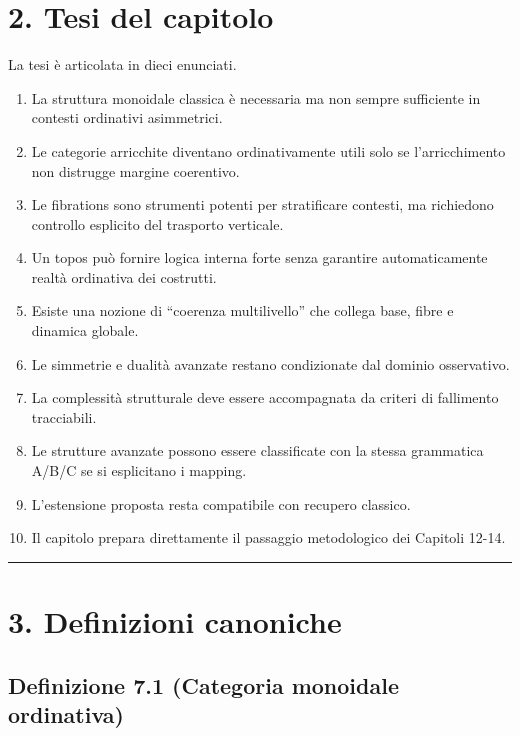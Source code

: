 \section{2. Tesi del capitolo}

La tesi è articolata in dieci enunciati.

\begin{enumerate}
\def\labelenumi{\arabic{enumi}.}
\tightlist
\item
  La struttura monoidale classica è necessaria ma non sempre sufficiente in contesti ordinativi asimmetrici.
\item
  Le categorie arricchite diventano ordinativamente utili solo se l'arricchimento non distrugge margine coerentivo.
\item
  Le fibrations sono strumenti potenti per stratificare contesti, ma richiedono controllo esplicito del trasporto verticale.
\item
  Un topos può fornire logica interna forte senza garantire automaticamente realtà ordinativa dei costrutti.
\item
  Esiste una nozione di ``coerenza multilivello'' che collega base, fibre e dinamica globale.
\item
  Le simmetrie e dualità avanzate restano condizionate dal dominio osservativo.
\item
  La complessità strutturale deve essere accompagnata da criteri di fallimento tracciabili.
\item
  Le strutture avanzate possono essere classificate con la stessa grammatica A/B/C se si esplicitano i mapping.
\item
  L'estensione proposta resta compatibile con recupero classico.
\item
  Il capitolo prepara direttamente il passaggio metodologico dei Capitoli 12-14.
\end{enumerate}

\begin{center}\rule{0.5\linewidth}{0.5pt}\end{center}

\section{3. Definizioni canoniche}

\subsection{Definizione 7.1 (Categoria monoidale ordinativa)}

